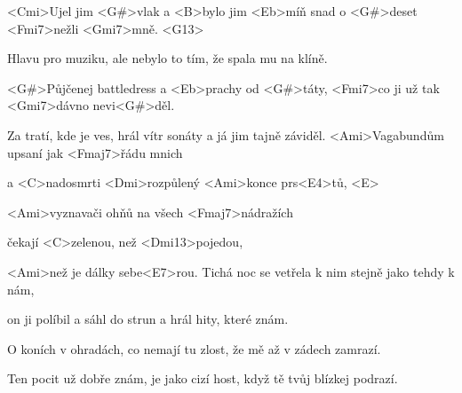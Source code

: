 
\zs
<Cmi>Ujel jim <G#>vlak a <B>bylo jim <Eb>míň snad o <G#>deset <Fmi7>nežli <Gmi7>mně. <G13>

Hlavu pro muziku, ale nebylo to tím, že spala mu na klíně.

<G#>Půjčenej battledress a <Eb>prachy od <G#>táty, <Fmi7>co ji už tak <Gmi7>dávno nevi<G#>děl.

Za tratí, kde je ves, hrál vítr sonáty a já jim tajně záviděl.
\ks
\zr
<Ami>Vagabundům upsaní jak <Fmaj7>řádu mnich

a <C>nadosmrti <Dmi>rozpůlený <Ami>konce prs<E4>tů, <E>


<Ami>vyznavači ohňů na všech <Fmaj7>nádražích

čekají <C>zelenou, než <Dmi13>pojedou,

<Ami>než je dálky sebe<E7>rou.
\kr
\zs
Tichá noc se vetřela k nim stejně jako tehdy k nám,

on ji políbil a sáhl do strun a hrál hity, které znám.

O koních v ohradách, co nemají tu zlost, že mě až v zádech zamrazí.

Ten pocit už dobře znám, je jako cizí host, když tě tvůj blízkej podrazí.
\ks
\zr
\kr
\kp





